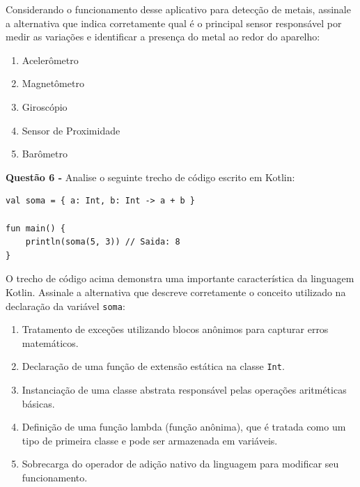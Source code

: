 \documentclass[12pt,a4paper]{article}
\begin{document}
\vspace{0.3cm}
Considerando o funcionamento desse aplicativo para detecção de metais, assinale a alternativa que indica corretamente qual é o principal sensor responsável por medir as variações e identificar a presença do metal ao redor do aparelho:

\vspace{0.4cm}

\begin{enumerate}[label=\alph*)]
    \item Acelerômetro
    \item Magnetômetro
    \item Giroscópio
    \item Sensor de Proximidade
    \item Barômetro
\end{enumerate}

\vspace{0.5cm}

\textbf{Questão 6 - } Analise o seguinte trecho de código escrito em Kotlin:

\begin{lstlisting}[basicstyle=\small\ttfamily, breaklines=true]
val soma = { a: Int, b: Int -> a + b }

fun main() {
    println(soma(5, 3)) // Saida: 8
}
\end{lstlisting}

O trecho de código acima demonstra uma importante característica da linguagem Kotlin. Assinale a alternativa que descreve corretamente o conceito utilizado na declaração da variável \texttt{soma}:

\begin{enumerate}[label=\alph*)]
    \item Tratamento de exceções utilizando blocos anônimos para capturar erros matemáticos.
    \item Declaração de uma função de extensão estática na classe \texttt{Int}.
    \item Instanciação de uma classe abstrata responsável pelas operações aritméticas básicas.
    \item Definição de uma função lambda (função anônima), que é tratada como um tipo de primeira classe e pode ser armazenada em variáveis.
    \item Sobrecarga do operador de adição nativo da linguagem para modificar seu funcionamento.
\end{enumerate}

\vspace{0.5cm}
\end{document}
